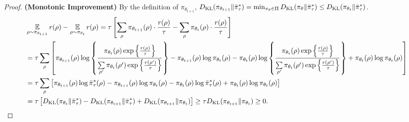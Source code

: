 \begin{proof}
	{\bf (Monotonic Improvement)} By the definition of $\pi_{\theta_{t+1}}$, $D_{\mathrm{KL}}(\pi_{\theta_{t+1}} \| \bar{\pi}_\tau^*)  = \min_{\pi_\theta \in \Pi}{ D_{\mathrm{KL}}(\pi_\theta \| \bar{\pi}_\tau^*)} \leq D_{\mathrm{KL}}(\pi_{\theta_{t}} \| \bar{\pi}_\tau^*)$.
	{\small
	\begin{equation*}
	\begin{split}
		&\operatorname*{\mathbb{E}}_{\rho \sim \pi_{\theta_{t+1}}}{  r(\rho)} - \operatorname*{\mathbb{E}}_{\rho \sim \pi_{\theta_{t}}}{  r(\rho)} = \tau \left[ \sum\limits_{\rho}{\pi_{\theta_{t+1}}(\rho) \cdot \frac{r(\rho)}{\tau}} - \sum\limits_{\rho}{\pi_{\theta_{t}}(\rho) \cdot \frac{r(\rho)}{\tau}} \right] \\
		&= \tau \sum\limits_{\rho}{\left[ \pi_{\theta_{t+1}}(\rho) \log\left\{ \frac{ \pi_{\theta_{t}}(\rho) \exp\left\{\frac{r(\rho)}{\tau}\right\} }{ \sum\limits_{\rho^\prime}{ \pi_{\theta_{t}}(\rho^\prime) \exp\left\{\frac{r(\rho^\prime)}{\tau}\right\} } } \right\} - \pi_{\theta_{t+1}}(\rho) \log{ \pi_{\theta_{t}}(\rho)} - \pi_{\theta_{t}}(\rho) \log\left\{ \frac{ \pi_{\theta_{t}}(\rho) \exp\left\{\frac{r(\rho)}{\tau}\right\} }{ \sum\limits_{\rho^\prime}{ \pi_{\theta_{t}}(\rho^\prime) \exp\left\{\frac{r(\rho^\prime)}{\tau}\right\} } } \right\} + \pi_{\theta_{t}}(\rho) \log{ \pi_{\theta_{t}}(\rho) } \right]} \\
		&= \tau \sum\limits_{\rho}{\left[ \pi_{\theta_{t+1}}(\rho) \log{ \bar{\pi}_\tau^*(\rho) } - \pi_{\theta_{t+1}}(\rho) \log{ \pi_{\theta_{t}}(\rho)} - \pi_{\theta_{t}}(\rho) \log{ \bar{\pi}_\tau^*(\rho) } + \pi_{\theta_{t}}(\rho) \log{ \pi_{\theta_{t}}(\rho) } \right]} \\
		&= \tau \left[ D_{\mathrm{KL}}(\pi_{\theta_t} \Vert \bar{\pi}_\tau^*) - D_{\mathrm{KL}}(\pi_{\theta_{t+1}} \Vert \bar{\pi}_\tau^*) + D_{\mathrm{KL}}(\pi_{\theta_{t+1}} \| \pi_{\theta_{t}}) \right] \ge \tau D_{\mathrm{KL}}(\pi_{\theta_{t+1}} \| \pi_{\theta_{t}}) \ge 0.
	\end{split}
	\end{equation*}
	}
	

\end{proof}

